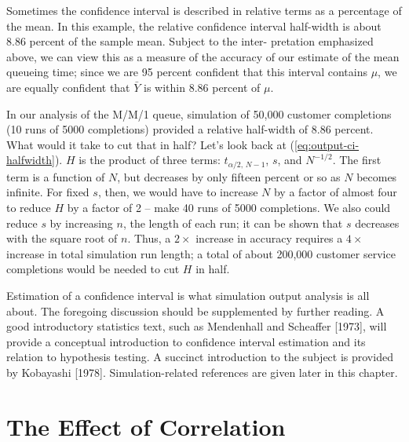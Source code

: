 Sometimes the confidence interval is described in relative terms as a
percentage of the mean. In this example, the relative confidence interval
half-width is about 8.86 percent of the sample mean. Subject to the
inter-
\noindent pretation emphasized above, we can view this as a measure of the
accuracy of our estimate of the mean queueing time; since we are 95 percent
confident that this interval contains $\mu$, we are equally confident that
$\bar{Y}$ is within 8.86 percent of $\mu$.

In our analysis of the M/M/1 queue, simulation of 50,000 customer completions
(10 runs of 5000 completions) provided a relative half-width of 8.86 percent.
What would it take to cut that in half? Let's look back at
(\ref{eq:output-ci-halfwidth}). $H$ is the product of three terms:
$t_{\alpha/2,\,N-1}$, $s$, and $N^{-1/2}$. The first term is a function of $N$,
but decreases by only fifteen percent or so as $N$ becomes infinite. For fixed
$s$, then, we would have to increase $N$ by a factor of almost four to reduce
$H$ by a factor of 2 -- make 40 runs of 5000 completions. We also could reduce
$s$ by increasing $n$, the length of each run; it can be shown that $s$
decreases with the square root of $n$. Thus, a $2\times$ increase in accuracy
requires a $4\times$ increase in total simulation run length; a total of about
200,000 customer service completions would be needed to cut $H$ in half.

Estimation of a confidence interval is what simulation output analysis is all
about. The foregoing discussion should be supplemented by further reading. A
good introductory statistics text, such as Mendenhall and Scheaffer [1973],
will provide a conceptual introduction to confidence interval estimation and
its relation to hypothesis testing. A succinct introduction to the subject is
provided by Kobayashi [1978]. Simulation-related references are given later in
this chapter.

\section{The Effect of Correlation}
\label{sec:effect-of-correlation}

